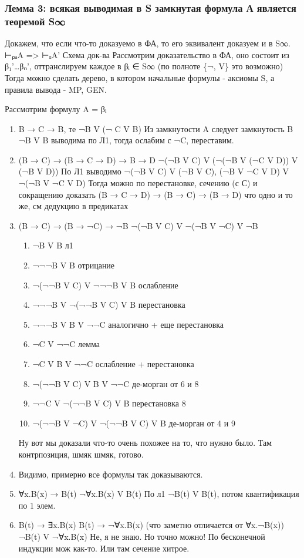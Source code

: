 \documentclass[11pt]{article}
\begin{document}
\subsubsection{Лемма 3: всякая выводимая в S замкнутая формула А является теоремой S∞}
\label{sec-18-3-3}
Докажем, что если что-то доказуемо в ФА, то его эквивалент
доказуем и в S∞.
⊢ₚₐA => ⊢ₛA'
Схема док-ва
Рассмотрим доказательство в ФА, оно состоит из
β₁'\ldots{}βₙ', оттранслируем каждое в βᵢ ∈ S∞ (по полноте \{¬, V\} это возможно)
Тогда можно сделать дерево, в котором начальные формулы - аксиомы S,
а правила вывода - MP, GEN.

Рассмотрим формулу A = βᵢ
\begin{enumerate}
\item B → C → B, те ¬B V (¬ C V B)
Из замкнутости A следует замкнутость B
¬B V B выводима по Л1, тогда ослабим с ¬C, переставим.
\item (B → C) → (B → C → D) → B → D
¬(¬B V C) V (¬(¬B V (¬C V D)) V (¬B V D))
По Л1 выводимо ¬(¬B V C) V (¬B V C),
(¬B V ¬C V D) V ¬(¬B V ¬C V D)
Тогда можно по перестановке, сечению (с С) и сокращению
доказать (B → C → D) → (B → C) → (B → D)
что одно и то же, см дедукцию в предикатах
\item (B → C) → (B → ¬C) → ¬B
¬(¬B V C) V ¬(¬B V ¬C) V ¬B
\begin{enumerate}
\item ¬B V B                        л1
\item ¬¬¬B V B                      отрицание
\item ¬(¬¬B V C) V ¬¬¬B V B         ослабление
\item ¬¬¬B V ¬(¬¬B V C) V B         перестановка
\item ¬¬¬B V B V ¬¬C                аналогично + еще перестановка
\item ¬C V ¬¬C                      лемма
\item ¬C V B V ¬¬C                  ослабление + перестановка
\item ¬(¬¬B V C) V B V ¬¬C          де-морган от 6 и 8
\item ¬¬C V ¬(¬¬B V C) V B          перестановка 8
\item ¬(¬¬B V ¬C) V ¬(¬¬B V C) V B де-морган от 4 и 9
\end{enumerate}
Ну вот мы доказали что-то очень похожее на то, что нужно было.
Там контрпозиция, шмяк шмяк, готово.
\item Видимо, примерно все формулы так доказываются.
\item ∀x.B(x) → B(t)
¬∀x.B(x) V B(t)
По л1 ¬B(t) V B(t), потом квантификация по 1 элем.
\item B(t) → ∃x.B(x)
B(t) → ¬∀x.B(x) (что заметно отличается от ∀x.¬B(x))
¬B(t) V ¬∀x.B(x)
Не, я не знаю. Но точно можно! По бесконечной индукции мож как-то.
Или там сечение хитрое.
\end{enumerate}
\end{document}
